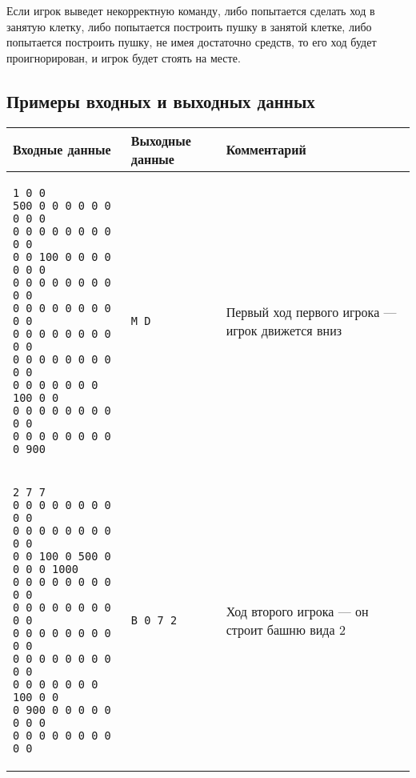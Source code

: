 \documentclass[14pt]{extarticle}
\begin{document}
Если игрок выведет некорректную команду, либо попытается сделать ход в занятую клетку, либо попытается построить пушку в занятой клетке, либо попытается построить пушку, не имея достаточно средств, то его ход будет проигнорирован, и игрок будет стоять на месте.

\subsection*{Примеры входных и выходных данных}
\begin{table}[h!]
\centering
\label{table-performance}
\begin{tabular}{|p{7cm}|p{2.8cm}|p{6cm}|} 
\hline
\textbf{Входные данные} & \textbf{Выходные данные} & \textbf{Комментарий} \\
\hline
\begin{verbatim}
1 0 0
500 0 0 0 0 0 0 0 0 0
0 0 0 0 0 0 0 0 0 0
0 0 100 0 0 0 0 0 0 0
0 0 0 0 0 0 0 0 0 0
0 0 0 0 0 0 0 0 0 0
0 0 0 0 0 0 0 0 0 0
0 0 0 0 0 0 0 0 0 0
0 0 0 0 0 0 0 100 0 0
0 0 0 0 0 0 0 0 0 0
0 0 0 0 0 0 0 0 0 900
\end{verbatim}
&
\begin{verbatim}
M D
\end{verbatim}
&
Первый ход первого игрока --- игрок движется вниз \\
\hline
\begin{verbatim}
2 7 7
0 0 0 0 0 0 0 0 0 0
0 0 0 0 0 0 0 0 0 0
0 0 100 0 500 0 0 0 0 1000
0 0 0 0 0 0 0 0 0 0
0 0 0 0 0 0 0 0 0 0
0 0 0 0 0 0 0 0 0 0
0 0 0 0 0 0 0 0 0 0
0 0 0 0 0 0 0 100 0 0
0 900 0 0 0 0 0 0 0 0
0 0 0 0 0 0 0 0 0 0
\end{verbatim}
&
\begin{verbatim}
B 0 7 2
\end{verbatim}
&
Ход второго игрока --- он строит башню вида 2\\
\hline
\end{tabular}
\end{table}
\end{document}
